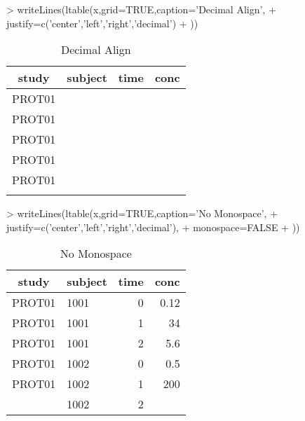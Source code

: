 \documentclass[titlepage]{article}
\begin{document}
\begin{Schunk}
\begin{Sinput}
> writeLines(ltable(x,grid=TRUE,caption='Decimal Align',
+     justify=c('center','left','right','decimal')
+ ))
\end{Sinput}
\begin{table}[!htpb]
 \caption[Decimal Align]{Decimal Align }
 \begin{center}
  \begin{tabular}{c|l|r|r}
    \hline \hline
   study & subject & time & conc \\ \hline
   PROT01 & \verb#1001# & \verb#0# & \verb#0.12# \\ \hline
   PROT01 & \verb#1001# & \verb#1# & \verb#34   # \\ \hline
   PROT01 & \verb#1001# & \verb#2# & \verb#5.6 # \\ \hline
   PROT01 & \verb#1002# & \verb#0# & \verb#0.5 # \\ \hline
   PROT01 & \verb#1002# & \verb#1# & \verb#200   # \\ \hline
    & \verb#1002# & \verb#2# & \verb## \\ \hline
  \end{tabular}
 \end{center}
\end{table}\end{Schunk}
\begin{Schunk}
\begin{Sinput}
> writeLines(ltable(x,grid=TRUE,caption='No Monospace',
+     justify=c('center','left','right','decimal'),
+     monospace=FALSE
+ ))
\end{Sinput}
\begin{table}[!htpb]
 \caption[No Monospace]{No Monospace }
 \begin{center}
  \begin{tabular}{c|l|r|r}
    \hline \hline
   study & subject & time & conc \\ \hline
   PROT01 & 1001 & 0 & 0.12 \\ \hline
   PROT01 & 1001 & 1 & 34    \\ \hline
   PROT01 & 1001 & 2 & 5.6  \\ \hline
   PROT01 & 1002 & 0 & 0.5  \\ \hline
   PROT01 & 1002 & 1 & 200    \\ \hline
    & 1002 & 2 &  \\ \hline
  \end{tabular}
 \end{center}
\end{table}\end{Schunk}
\end{document}

